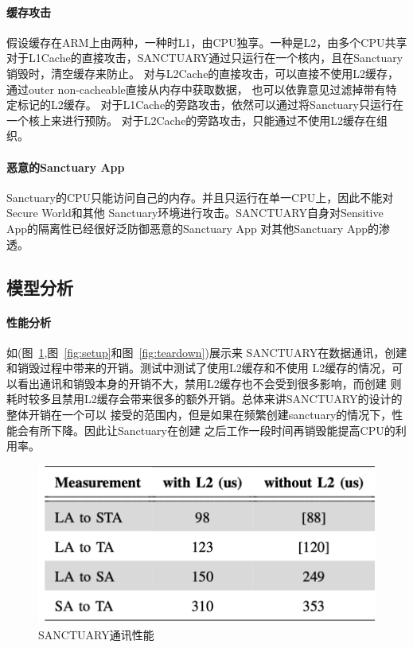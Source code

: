 \paragraph{缓存攻击}
假设缓存在ARM上由两种，一种时L1，由CPU独享。一种是L2，由多个CPU共享
对于L1Cache的直接攻击\cite{trustZone-p3}，SANCTUARY通过只运行在一个核内，且在Sanctuary销毁时，清空缓存来防止。
对与L2Cache的直接攻击\cite{trustZone-p2}，可以直接不使用L2缓存，通过outer non-cacheable直接从内存中获取数据，
也可以依靠意见过滤掉带有特定标记的L2缓存。
对于L1Cache的旁路攻击\cite{trustZone-p3}，依然可以通过将Sanctuary只运行在一个核上来进行预防。
对于L2Cache的旁路攻击\cite{trustZone-p2}，只能通过不使用L2缓存在组织。

\paragraph{恶意的Sanctuary App}
Sanctuary的CPU只能访问自己的内存。并且只运行在单一CPU上，因此不能对Secure World和其他
Sanctuary环境进行攻击。SANCTUARY自身对Sensitive App的隔离性已经很好泛防御恶意的Sanctuary App
对其他Sanctuary App的渗透。

\subsection{模型分析}

\paragraph{性能分析}
如(图~\ref{fig:datacom},图~\ref{fig:setup}和图~\ref{fig:teardown})展示来
SANCTUARY在数据通讯，创建和销毁过程中带来的开销。测试中测试了使用L2缓存和不使用
L2缓存的情况，可以看出通讯和销毁本身的开销不大，禁用L2缓存也不会受到很多影响，而创建
则耗时较多且禁用L2缓存会带来很多的额外开销。总体来讲SANCTUARY的设计的整体开销在一个可以
接受的范围内，但是如果在频繁创建sanctuary的情况下，性能会有所下降。因此让Sanctuary在创建
之后工作一段时间再销毁能提高CPU的利用率。

\begin{figure}
    \centering
    \includegraphics[scale=0.45]{Figures/trustzone/datacom.png}
    \decoRule
    \caption{SANCTUARY通讯性能}
    \label{fig:datacom}
\end{figure}

